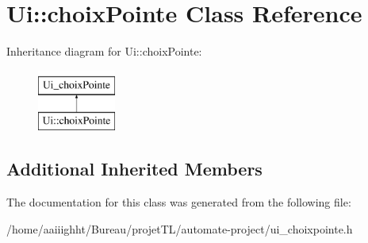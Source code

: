 \hypertarget{class_ui_1_1choix_pointe}{\section{Ui\-:\-:choix\-Pointe Class Reference}
\label{class_ui_1_1choix_pointe}
}
Inheritance diagram for Ui\-:\-:choix\-Pointe\-:\begin{figure}[H]
\begin{center}
\leavevmode
\includegraphics[height=2.000000cm]{class_ui_1_1choix_pointe}
\end{center}
\end{figure}
\subsection*{Additional Inherited Members}


The documentation for this class was generated from the following file\-:\begin{DoxyCompactItemize}
\item 
/home/aaiiighht/\-Bureau/projet\-T\-L/automate-\/project/ui\-\_\-choixpointe.\-h\end{DoxyCompactItemize}
